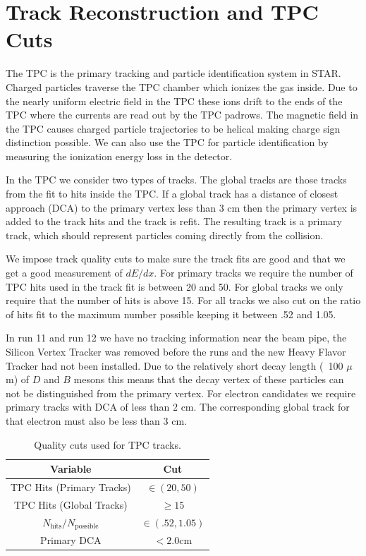 \section{Track Reconstruction and TPC Cuts}

The TPC is the primary tracking and particle identification system in STAR. Charged particles traverse the TPC chamber which ionizes the gas inside. Due to the nearly uniform electric field in the TPC these ions drift to the ends of the TPC where the currents are read out by the TPC padrows. The magnetic field in the TPC causes charged particle trajectories to be helical making charge sign distinction possible. We can also use the TPC for particle identification by measuring the ionization energy loss in the detector. 

In the TPC we consider two types of tracks. The global tracks are those tracks from the fit to hits inside the TPC. If a global track has a distance of closest approach (DCA) to the primary vertex less than 3 cm then the primary vertex is added to the track hits and the track is refit. The resulting track is a primary track, which should represent particles coming directly from the collision.

We impose track quality cuts to make sure the track fits are good and that we get a good measurement of $dE/dx$. For primary tracks we require the number of TPC hits used in the track fit is between 20 and 50. For global tracks we only require that the number of hits is above 15. For all tracks we also cut on the ratio of hits fit to the maximum number possible keeping it between .52 and 1.05.

In run 11 and run 12 we have no tracking information near the beam pipe, the Silicon Vertex Tracker was removed before the runs and the new Heavy Flavor Tracker had not been installed. Due to the relatively short decay length (~100 $\mu$m) of $D$ and $B$ mesons this means that the decay vertex of these particles can not be distinguished from the primary vertex. For electron candidates we require primary tracks with DCA of less than 2 cm. The corresponding global track for that electron must also be less than 3 cm. 

\begin{table}
\centering
\begin{tabular}{|c|c|}
\hline
Variable            & Cut \\
\hline
TPC Hits (Primary Tracks)          & $\in(20, 50)$ \\
\hline
TPC Hits (Global Tracks)          & $\geq 15$ \\
\hline
$N_{\text{hits}}/N_{\text{possible}}$               & $\in(.52, 1.05)$ \\
\hline
Primary DCA          & $< 2.0$cm \\
\hline
\end{tabular}
\caption[Track Quality Cuts]{Quality cuts used for TPC tracks.}
\label{tab:TPCQual}
\end{table}

